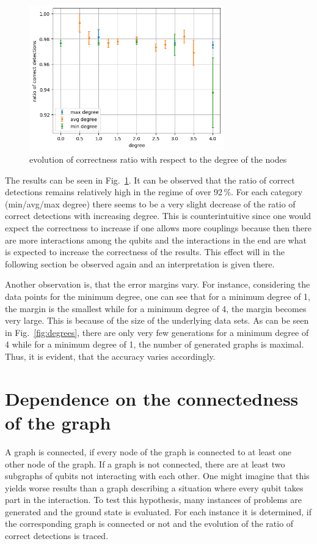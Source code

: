 \documentclass{article}
\begin{document}
	\begin{figure}[h]
		\centering
		\includegraphics[width=0.75\textwidth]{img/deg_ratio.png}
		\caption{evolution of correctness ratio with respect to the degree of the nodes}
		\label{fig:correctness degree}
	\end{figure}
	The results can be seen in Fig.~\ref{fig:correctness degree}. It can be observed that the ratio of correct detections remains relatively high in the regime of over 92\,\%. For each category (min/avg/max degree) there seems to be a very slight decrease of the ratio of correct detections with increasing degree. This is counterintuitive since one would expect the correctness to increase if one allows more couplings because then there are more interactions among the qubits and the interactions in the end are what is expected to increase the correctness of the results. This effect will in the following section be observed again and an interpretation is given there. 
	
	Another observation is, that the error margins vary. For instance, considering the data points for the minimum degree, one can see that for a minimum degree of 1, the margin is the smallest while for a minimum degree of 4, the margin becomes very large. This is because of the size of the underlying data sets. As can be seen in Fig.~\ref{fig:degrees}, there are only very few generations for a minimum degree of 4 while for a minimum degree of 1, the number of generated graphs is maximal. Thus, it is evident, that the accuracy varies accordingly.   
	
	\section{Dependence on the connectedness of the graph}
	A graph is connected, if every node of the graph is connected to at least one other node of the graph. If a graph is not connected, there are at least two subgraphs of qubits not interacting with each other. One might imagine that this yields worse results than a graph describing a situation where every qubit takes part in the interaction. To test this hypothesis, many instances of problems are generated and the ground state is evaluated. For each instance it is determined, if the corresponding graph is connected or not and the evolution of the ratio of correct detections is traced. 
	
\end{document}
